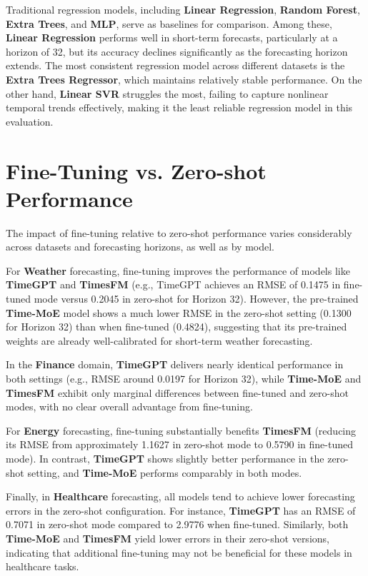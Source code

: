 Traditional regression models, including \textbf{Linear Regression}, \textbf{Random Forest}, \textbf{Extra Trees}, and \textbf{MLP}, serve as baselines for comparison. Among these, \textbf{Linear Regression} performs well in short-term forecasts, particularly at a horizon of 32, but its accuracy declines significantly as the forecasting horizon extends. The most consistent regression model across different datasets is the \textbf{Extra Trees Regressor}, which maintains relatively stable performance. On the other hand, \textbf{Linear SVR} struggles the most, failing to capture nonlinear temporal trends effectively, making it the least reliable regression model in this evaluation.


\section{Fine-Tuning vs. Zero-shot Performance}

The impact of fine-tuning relative to zero-shot performance varies considerably across datasets and forecasting horizons, as well as by model.

For \textbf{Weather} forecasting, fine-tuning improves the performance of models like \textbf{TimeGPT} and \textbf{TimesFM} (e.g., TimeGPT achieves an RMSE of 0.1475 in fine-tuned mode versus 0.2045 in zero-shot for Horizon 32). However, the pre-trained \textbf{Time-MoE} model shows a much lower RMSE in the zero-shot setting (0.1300 for Horizon 32) than when fine-tuned (0.4824), suggesting that its pre-trained weights are already well-calibrated for short-term weather forecasting.

In the \textbf{Finance} domain, \textbf{TimeGPT} delivers nearly identical performance in both settings (e.g., RMSE around 0.0197 for Horizon 32), while \textbf{Time-MoE} and \textbf{TimesFM} exhibit only marginal differences between fine-tuned and zero-shot modes, with no clear overall advantage from fine-tuning.

For \textbf{Energy} forecasting, fine-tuning substantially benefits \textbf{TimesFM} (reducing its RMSE from approximately 1.1627 in zero-shot mode to 0.5790 in fine-tuned mode). In contrast, \textbf{TimeGPT} shows slightly better performance in the zero-shot setting, and \textbf{Time-MoE} performs comparably in both modes.

Finally, in \textbf{Healthcare} forecasting, all models tend to achieve lower forecasting errors in the zero-shot configuration. For instance, \textbf{TimeGPT} has an RMSE of 0.7071 in zero-shot mode compared to 2.9776 when fine-tuned. Similarly, both \textbf{Time-MoE} and \textbf{TimesFM} yield lower errors in their zero-shot versions, indicating that additional fine-tuning may not be beneficial for these models in healthcare tasks.

